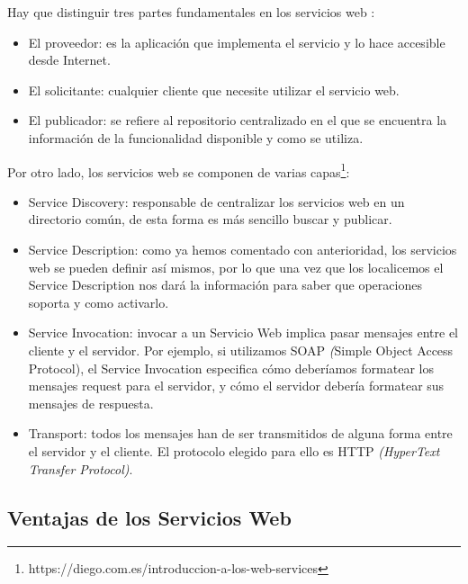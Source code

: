 Hay que distinguir tres partes fundamentales en los servicios web \citep{TorresJoaquin2017SC}:
\begin{itemize}
	\item El proveedor: es la aplicación que implementa el servicio y lo hace accesible desde Internet.
	\item El solicitante: cualquier cliente que necesite utilizar el servicio web.
	\item El publicador: se refiere al repositorio centralizado en el que se encuentra la información de la funcionalidad disponible y como se utiliza.
	
\end{itemize}
Por otro lado, los servicios web se componen de varias capas\footnote{https://diego.com.es/introduccion-a-los-web-services}:
\begin{itemize}
	\item Service Discovery: responsable de centralizar los servicios web en un directorio común, de esta forma es más sencillo buscar y publicar.
	\item Service Description: como ya hemos comentado con anterioridad, los servicios web se pueden definir así mismos, por lo que una vez que los localicemos el Service Description nos dará la información para saber que operaciones soporta y como activarlo.
	\item Service Invocation: invocar a un Servicio Web implica pasar mensajes entre el cliente y el servidor. Por ejemplo, si utilizamos SOAP  \textit({Simple Object Access Protocol}), el Service Invocation especifica cómo deberíamos formatear los mensajes request para el servidor, y cómo el servidor debería formatear sus mensajes de respuesta.
	\item Transport: todos los mensajes han de ser transmitidos de alguna forma entre el servidor y el cliente. El protocolo elegido para ello es HTTP \textit{(HyperText Transfer Protocol)}. 
\end{itemize}



\subsection{Ventajas de los  Servicios Web}
\label{cap:subsec:ventajasserviciosweb}


